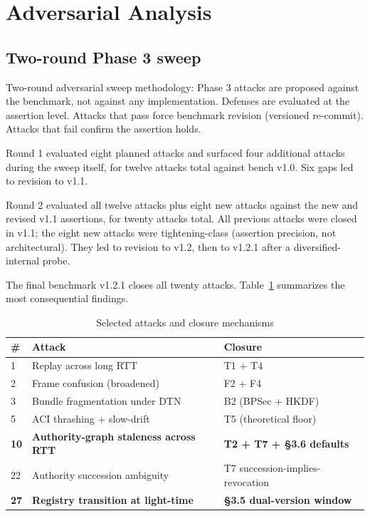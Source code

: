\documentclass[conference]{IEEEtran}
\begin{document}
\section{Adversarial Analysis}\label{sec:adversarial}

\subsection{Two-round Phase 3 sweep}

Two-round adversarial sweep methodology: Phase 3 attacks are proposed against the benchmark, not against any implementation. Defenses are evaluated at the assertion level. Attacks that pass force benchmark revision (versioned re-commit). Attacks that fail confirm the assertion holds.

Round 1 evaluated eight planned attacks and surfaced four additional attacks during the sweep itself, for twelve attacks total against bench v1.0. Six gaps led to revision to v1.1.

Round 2 evaluated all twelve attacks plus eight new attacks against the new and revised v1.1 assertions, for twenty attacks total. All previous attacks were closed in v1.1; the eight new attacks were tightening-class (assertion precision, not architectural). They led to revision to v1.2, then to v1.2.1 after a diversified-internal probe.

The final benchmark v1.2.1 closes all twenty attacks. Table~\ref{tab:attacks} summarizes the most consequential findings.

\begin{table}[h]
\caption{Selected attacks and closure mechanisms}
\label{tab:attacks}
\centering
\small
\begin{tabular}{p{0.4cm}p{3.0cm}p{3.4cm}}
\toprule
\textbf{\#} & \textbf{Attack} & \textbf{Closure} \\
\midrule
1 & Replay across long RTT & T1 + T4 \\
2 & Frame confusion (broadened) & F2 + F4 \\
3 & Bundle fragmentation under DTN & B2 (BPSec + HKDF) \\
5 & ACI thrashing + slow-drift & T5 (theoretical floor) \\
\textbf{10} & \textbf{Authority-graph staleness across RTT} & \textbf{T2 + T7 + \S 3.6 defaults} \\
22 & Authority succession ambiguity & T7 succession-implies-revocation \\
\textbf{27} & \textbf{Registry transition at light-time} & \textbf{\S 3.5 dual-version window} \\
\bottomrule
\end{tabular}
\end{table}
\end{document}
